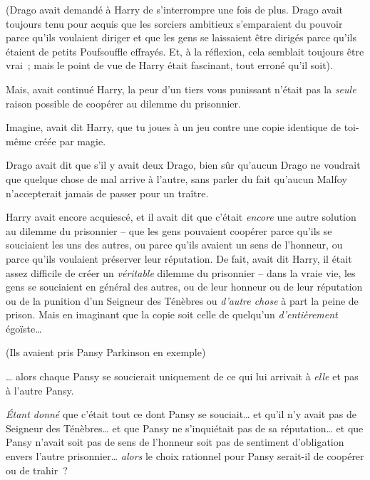 (Drago avait demandé à Harry de s'interrompre une fois de plus. Drago avait toujours tenu pour acquis que les sorciers ambitieux s'emparaient du pouvoir parce qu'ils voulaient diriger et que les gens se laissaient être dirigés parce qu'ils étaient de petits Poufsouffle effrayés. Et, à la réflexion, cela semblait toujours être vrai~; mais le point de vue de Harry était fascinant, tout erroné qu'il soit).

Mais, avait continué Harry, la peur d'un tiers vous punissant n'était pas la \emph{seule} raison possible de coopérer au dilemme du prisonnier.

Imagine, avait dit Harry, que tu joues à un jeu contre une copie identique de toi-même créée par magie.

Drago avait dit que s'il y avait deux Drago, bien sûr qu'aucun Drago ne voudrait que quelque chose de mal arrive à l'autre, sans parler du fait qu'aucun Malfoy n'accepterait jamais de passer pour un traître.

Harry avait encore acquiescé, et il avait dit que c'était \emph{encore} une autre solution au dilemme du prisonnier -- que les gens pouvaient coopérer parce qu'ils se souciaient les uns des autres, ou parce qu'ils avaient un sens de l'honneur, ou parce qu'ils voulaient préserver leur réputation. De fait, avait dit Harry, il était assez difficile de créer un \emph{véritable} dilemme du prisonnier -- dans la vraie vie, les gens se souciaient en général des autres, ou de leur honneur ou de leur réputation ou de la punition d'un Seigneur des Ténèbres ou \emph{d'autre chose} à part la peine de prison. Mais en imaginant que la copie soit celle de quelqu'un \emph{d'entièrement} égoïste…

(Ils avaient pris Pansy Parkinson en exemple)

… alors chaque Pansy se soucierait uniquement de ce qui lui arrivait à \emph{elle} et pas à l'autre Pansy.

\emph{Étant donné} que c'était tout ce dont Pansy se souciait… et qu'il n'y avait pas de Seigneur des Ténèbres… et que Pansy ne s'inquiétait pas de sa réputation… et que Pansy n'avait soit pas de sens de l'honneur soit pas de sentiment d'obligation envers l'autre prisonnier… \emph{alors} le choix rationnel pour Pansy serait-il de coopérer ou de trahir~?

